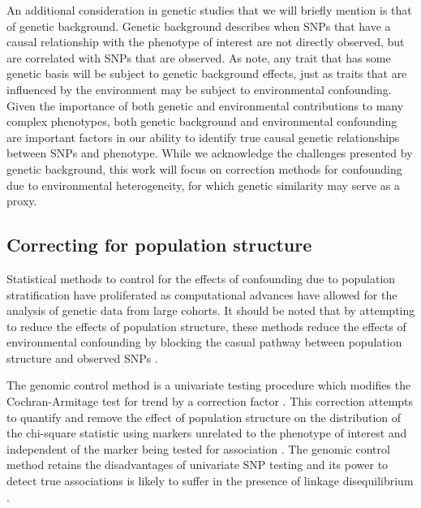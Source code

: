 An additional consideration in genetic studies that we will briefly mention is that of genetic background. Genetic background describes when SNPs that have a causal relationship with the phenotype of interest are not directly observed, but are correlated with SNPs that are observed. As \cite{vilhjalmsson2012nature} note, any trait that has some genetic basis will be subject to genetic background effects, just as traits that are influenced by the environment may be subject to environmental confounding. Given the importance of both genetic and environmental contributions to many complex phenotypes, both genetic background and environmental confounding are important factors in our ability to identify true causal genetic relationships between SNPs and phenotype. While we acknowledge the challenges presented by genetic background, this work will focus on correction methods for confounding due to environmental heterogeneity, for which genetic similarity may serve as a proxy.


\subsection{Correcting for population structure}

Statistical methods to control for the effects of confounding due to population stratification have proliferated as computational advances have allowed for the analysis of genetic data from large cohorts. It should be noted that by attempting to reduce the effects of population structure, these methods reduce the effects of environmental confounding by blocking the casual pathway between population structure and observed SNPs . 

The genomic control method is a univariate testing procedure which modifies the Cochran-Armitage test for trend by a correction factor . This correction attempts to quantify and remove the effect of population structure on the distribution of the chi-square statistic using markers unrelated to the phenotype of interest and independent of the marker being tested for association \cite{devlin1999genomic, bacanu2000power, wang2009testing}. The genomic control method retains the disadvantages of univariate SNP testing and its power to detect true associations is likely to suffer in the presence of linkage disequilibrium .  

